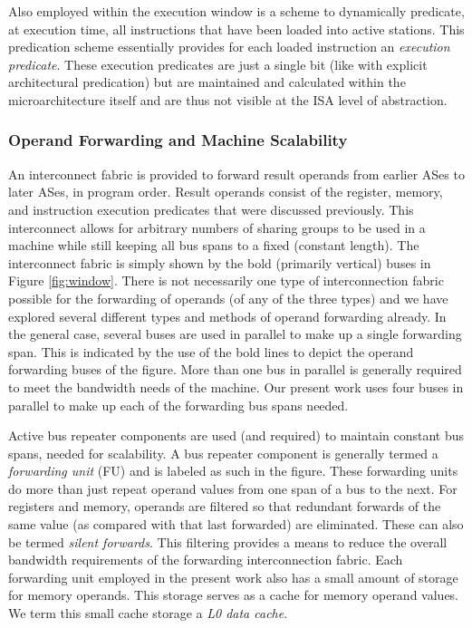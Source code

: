 \documentclass[10pt,dvips]{article}
\begin{document}
Also employed within the execution window is a scheme to
dynamically predicate, at execution time, 
all instructions that have been loaded
into active stations.  
This predication scheme essentially provides for each loaded instruction
an \textit{execution predicate}.  These execution predicates
are just a single bit (like with explicit architectural predication)
but are maintained and calculated within the microarchitecture
itself and are thus not visible at the ISA level of abstraction.
%
\subsubsection{Operand Forwarding and Machine Scalability}
%
An interconnect fabric is provided to forward result
operands from earlier ASes to 
later ASes, in program order.  
Result operands consist of the register, memory, and
instruction execution predicates that were discussed previously.
This interconnect allows for arbitrary numbers of sharing
groups to be used in a machine while still keeping all bus
spans to a fixed (constant length).
The interconnect fabric is simply shown by
the bold (primarily vertical) buses in 
Figure \ref{fig:window}.
There is not necessarily one type of interconnection
fabric possible for the forwarding of operands (of any of the
three types)
and we have explored several
different types and methods of operand forwarding already.
In the general case, several buses are used in parallel to make up
a single forwarding span.
This is indicated by the use of the
bold lines to depict the operand forwarding buses of the figure.  
More than one
bus in parallel is generally required to meet
the bandwidth needs of the machine.
Our present work uses four buses in parallel to make up
each of the forwarding bus spans needed.

Active bus repeater components are used (and required) to 
maintain constant bus spans, needed for scalability.
A bus repeater component is generally termed a
\textit{forwarding unit} (FU) and is labeled as such in the figure.
These forwarding units do more than just repeat operand values from
one span of a bus to the next.
For registers and memory, operands are filtered so that
redundant forwards of the same value (as compared with that last forwarded)
are eliminated.  These can also be termed \textit{silent forwards}.
This filtering provides a means to reduce the overall bandwidth
requirements of the forwarding interconnection fabric.
Each forwarding unit employed in the present work also has a small
amount of storage for memory operands.
This storage serves as a cache for memory operand values.
We term this small cache storage a \textit{L0 data cache}.
\end{document}
